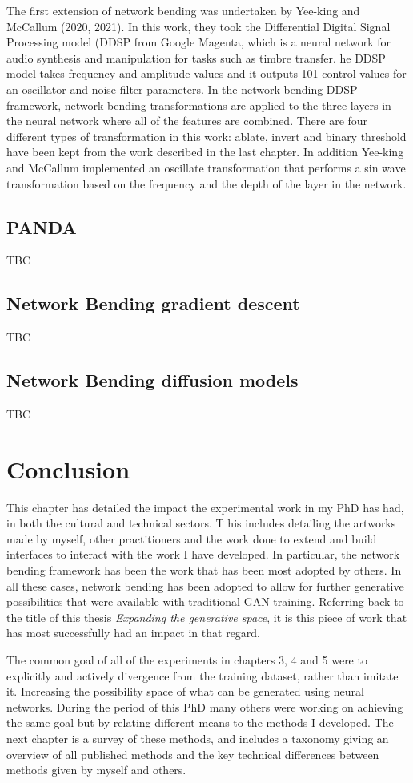 The first extension of network bending was undertaken by Yee-king and McCallum (2020, 2021). 
In this work, they took the Differential Digital Signal Processing model (DDSP from Google Magenta, which is a neural network for audio synthesis and manipulation for tasks such as timbre transfer. 
he DDSP model takes frequency and amplitude values and it outputs 101 control values for an oscillator and noise filter parameters. 
In the network bending DDSP framework, network bending transformations are applied to the three layers in the neural network where all of the features are combined. 
There are four different types of transformation in this work: ablate, invert and binary threshold have been kept from the work described in the last chapter.
 In addition Yee-king and McCallum implemented an oscillate transformation that performs a sin wave transformation based on the frequency and the depth of the layer in the network. 

\subsection{PANDA}

TBC

\subsection{Network Bending gradient descent}

TBC

\subsection{Network Bending diffusion models}

TBC

\section{Conclusion}

This chapter has detailed the impact the experimental work in my PhD has had, in both the cultural and technical sectors. T
his includes detailing the artworks made by myself, other practitioners and the work done to extend and build interfaces to interact with the work I have developed. 
In particular, the network bending framework has been the work that has been most adopted by others. 
In all these cases, network bending has been adopted to allow for further generative possibilities that were available with traditional GAN training. 
Referring back to the title of this thesis \textit{Expanding the generative space}, it is this piece of work that has most successfully had an impact in that regard. 

The common goal of all of the experiments in chapters 3, 4 and 5 were to explicitly and actively divergence from the training dataset, rather than imitate it. 
Increasing the possibility space of what can be generated using neural networks. 
During the period of this PhD many others were working on achieving the same goal but by relating different means to the methods I developed. 
The next chapter is a survey of these methods, and includes a taxonomy giving an overview of all published methods and the key technical differences between methods given by myself and others. 
